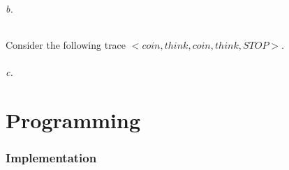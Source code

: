 \documentclass[a4paper, 11pt]{article}
\begin{document}
\paragraph{b.} %
\label{par:b_}
Consider the following trace $<coin,think,coin,think,STOP>$. 

\paragraph{c.} %
\label{par:c_}




\part{Programming} %
\label{prt:programming_}

\section{Implementation} %
\label{sec:implementation}


\end{document}
